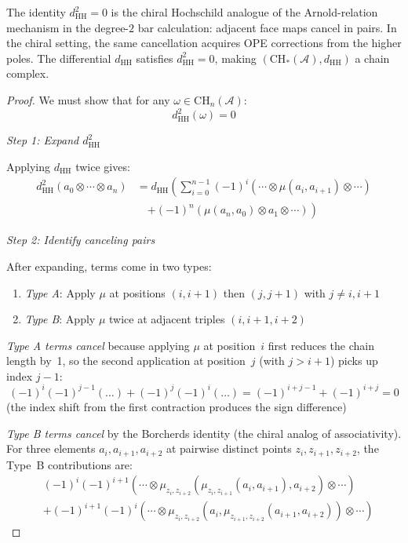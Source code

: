 \begin{theorem}
\label{thm:hochschild-chain-complex}
The identity $d_{\text{HH}}^2 = 0$ is the chiral Hochschild analogue
of the Arnold-relation mechanism in the degree-$2$ bar calculation:
adjacent face maps cancel in pairs. In the chiral setting, the same
cancellation acquires OPE corrections from the higher poles.
The differential $d_{\text{HH}}$ satisfies $d_{\text{HH}}^2 = 0$, making
$(\text{CH}_*(\mathcal{A}), d_{\text{HH}})$ a chain complex.
\end{theorem}

\begin{proof}
We must show that for any $\omega \in \text{CH}_n(\mathcal{A})$:
\[d_{\text{HH}}^2(\omega) = 0\]

\emph{Step 1: Expand $d_{\text{HH}}^2$}

Applying $d_{\text{HH}}$ twice gives:
\begin{align*}
d_{\text{HH}}^2(a_0 \otimes \cdots \otimes a_n)
&= d_{\text{HH}}\left(\sum_{i=0}^{n-1} (-1)^i (\cdots \otimes \mu(a_i, a_{i+1})
 \otimes \cdots)\right. \\
&\quad\left. + (-1)^n (\mu(a_n, a_0) \otimes a_1 \otimes \cdots)\right)
\end{align*}

\emph{Step 2: Identify canceling pairs}

After expanding, terms come in two types:
\begin{enumerate}
\item \emph{Type A}: Apply $\mu$ at positions $(i,i+1)$ then $(j,j+1)$ with $j \neq i, i+1$
\item \emph{Type B}: Apply $\mu$ twice at adjacent triples $(i,i+1,i+2)$
\end{enumerate}

\emph{Type A terms cancel} because applying $\mu$ at position~$i$ first reduces the chain length by~1, so the second application at position~$j$ (with $j > i+1$) picks up index $j-1$:
\[(-1)^i (-1)^{j-1} (\ldots) +
 (-1)^j (-1)^{i} (\ldots) = (-1)^{i+j-1} + (-1)^{i+j} = 0\]
(the index shift from the first contraction produces the sign difference)

\emph{Type B terms cancel} by the Borcherds identity (the chiral analog of associativity).
For three elements $a_i, a_{i+1}, a_{i+2}$ at pairwise distinct points $z_i, z_{i+1}, z_{i+2}$,
the Type~B contributions are:
\begin{align*}
&(-1)^i(-1)^{i+1}(\cdots \otimes \mu_{z_i, z_{i+2}}(\mu_{z_i, z_{i+1}}(a_i,a_{i+1}),a_{i+2}) \otimes \cdots) \\
&+ (-1)^{i+1}(-1)^i (\cdots \otimes \mu_{z_i, z_{i+2}}(a_i,\mu_{z_{i+1}, z_{i+2}}(a_{i+1},a_{i+2})) \otimes \cdots)
\end{align*}


\end{proof}
